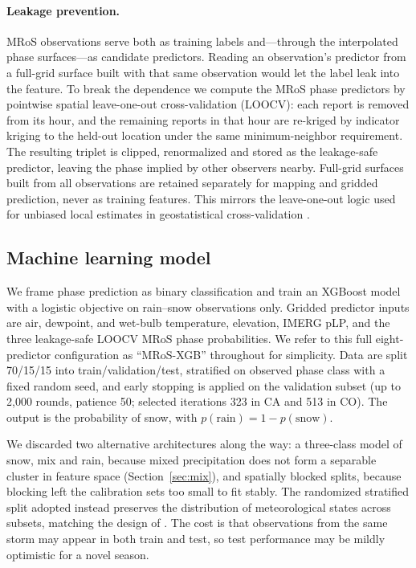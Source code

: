 \documentclass[twocol]{ametsocV6.1} %
\begin{document}
\paragraph{Leakage prevention.}
MRoS observations serve both as training labels and---through the
interpolated phase surfaces---as candidate predictors. Reading an
observation's predictor from a full-grid surface built with that same
observation would let the label leak into the feature. To break the
dependence we compute the MRoS phase predictors by pointwise spatial
leave-one-out cross-validation (LOOCV): each report is removed from its
hour, and the remaining reports in that hour are re-kriged by indicator
kriging to the held-out location under the same minimum-neighbor
requirement. The resulting triplet is clipped, renormalized and stored
as the leakage-safe predictor, leaving the phase implied by other
observers nearby. Full-grid surfaces
built from all observations are retained separately for mapping and
gridded prediction, never as training features. This mirrors the
leave-one-out logic used for unbiased local estimates in geostatistical
cross-validation \citep{goovaerts1997}.


\subsection{Machine learning model}
\label{sec:ml}
We frame phase prediction as binary classification and train an
XGBoost model \citep{chen2016} with a logistic objective on rain--snow
observations only. Gridded predictor inputs are 
air, dewpoint, and wet-bulb temperature, elevation, IMERG pLP, and the three leakage-safe LOOCV
MRoS phase probabilities. We refer to this full eight-predictor configuration 
as ``MRoS-XGB'' throughout for simplicity. Data are split 70/15/15 into
train/validation/test, stratified on observed phase class with a fixed
random seed, and early stopping is applied on the validation subset (up
to 2{,}000 rounds, patience 50; selected iterations 323 in CA and 513
in CO). The output is the probability of snow, with $p(\mathrm{rain}) = 1 - p(\mathrm{snow})$.

We discarded two alternative architectures along the way: a three-class model of
snow, mix and rain, because mixed precipitation does not form a
separable cluster in feature space (Section~\ref{sec:mix}), and
spatially blocked splits, because blocking left the calibration sets too
small to fit stably. The randomized stratified split adopted instead
preserves the distribution of meteorological states across subsets,
matching the design of \citet{jennings2025}. The cost is
that observations from the same storm may appear in both train and test,
so test performance may be mildly optimistic for a novel season.
\end{document}
